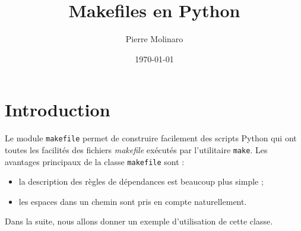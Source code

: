 \documentclass[a4paper,12pt,obeyspaces,openany]{extarticle}
\begin{document}
 


\title{\Huge{\textbf{Makefiles en Python}}}
\author{Pierre Molinaro}
\date \today 

\maketitle


\section{Introduction}

Le module \texttt{makefile} permet de construire facilement des scripts Python qui ont toutes les facilités des fichiers \emph{makefile} exécutés par l'utilitaire \texttt{make}. Les avantages principaux de la classe \texttt{makefile} sont :
\begin{itemize}
  \item la description des règles de dépendances est beaucoup plus simple ;
  \item les espaces dans un chemin sont pris en compte naturellement. 
\end{itemize}

Dans la suite, nous allons donner un exemple d'utilisation de cette classe.
\end{document}

